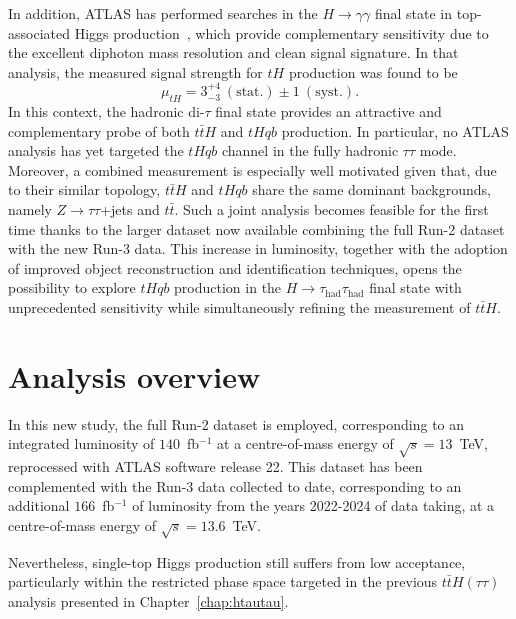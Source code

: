   In addition, ATLAS has performed searches in the $H \to \gamma\gamma$ final state in top-associated Higgs production~\cite{thgammagamma}, which provide complementary sensitivity due to the excellent diphoton mass resolution and clean signal signature. 
  In that analysis, the measured signal strength for $tH$ production was found to be
  \[
  \mu_{tH} = 3^{+4}_{-3}~(\text{stat.}) \pm 1~(\text{syst.}).
  \]    
  In this context, the hadronic di-$\tau$ final state provides an attractive and complementary probe of both $t\bar{t}H$ and $tHqb$ production. 
  In particular, no ATLAS analysis has yet targeted the $tHqb$ channel in the fully hadronic $\tau\tau$ mode. 
  Moreover, a combined measurement is especially well motivated given that, due to their similar topology, $t\bar{t}H$ and $tHqb$ share the same dominant backgrounds, namely $Z\to\tau\tau$+jets and $t\bar{t}$. 
  Such a joint analysis becomes feasible for the first time thanks to the larger dataset now available combining the full Run-2 dataset with the new Run-3 data.
  This increase in luminosity, together with the adoption of improved object reconstruction and identification techniques, opens the possibility to explore $tHqb$ production in the $H\to\tau_{\mathrm{had}}\tau_{\mathrm{had}}$ final state with unprecedented sensitivity while simultaneously refining the measurement of $t\bar{t}H$.
  



\section{Analysis overview}

In this new study, the full Run-2 dataset is employed, corresponding to an integrated luminosity of $140$~fb$^{-1}$ at a centre-of-mass energy of $\sqrt{s}=13$~TeV, reprocessed with ATLAS software release 22. 
This dataset has been complemented with the Run-3 data collected to date, corresponding to an additional $166$~fb$^{-1}$ of luminosity from the years 2022-2024 of data taking, at a centre-of-mass energy of $\sqrt{s}=13.6$~TeV.

Nevertheless, single-top Higgs production still suffers from low acceptance, particularly within the restricted phase space targeted in the previous $t\bar{t}H(\tau\tau)$ analysis presented in Chapter~\ref{chap:htautau}. 

